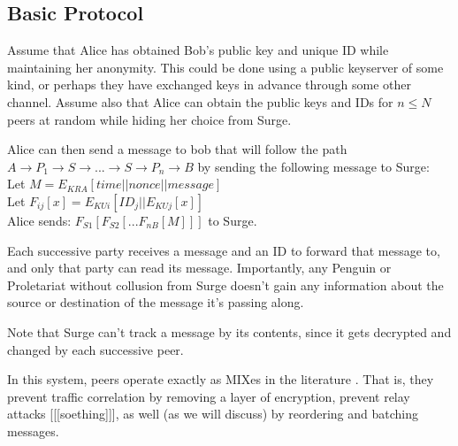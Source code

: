 \documentclass[twocolumn]{paper}
\begin{document}
\subsection{Basic Protocol}
Assume that Alice has obtained Bob's public key and unique ID while maintaining her anonymity. This could be done using a public keyserver of some kind, or perhaps they have exchanged keys in advance through some other channel. Assume also that Alice can obtain the public keys and IDs for $n \le N$ peers at random while hiding her choice from Surge. 

Alice can then send a message to bob that will follow the path $A \rightarrow P_1 \rightarrow S \rightarrow ... \rightarrow S \rightarrow P_n \rightarrow B$ by sending the following message to Surge: 
\\
Let $M = E_{KRA}[  time || nonce || message ]$
\\Let $F_{ij}[x] = E_{KUi}[ ID_j || E_{KUj}[ x ] ]$
\\
Alice sends: $F_{S1}[F_{S2}[...F_{nB}[ M ]]]$ to Surge. 

Each successive party receives a message and an ID to forward that message to, and only that party can read its message. Importantly, any Penguin or Proletariat without collusion from Surge doesn't gain any information about the source or destination of the message it's passing along. 

Note that Surge can't track a message by its contents, since it gets decrypted and changed by each successive peer. 

In this system, peers operate exactly as MIXes in the literature \cite{chaum-mix} . That is, they prevent traffic correlation by removing a layer of encryption, prevent relay attacks [[[soething]]], as well (as we will discuss) by reordering and batching messages. 
\end{document}
